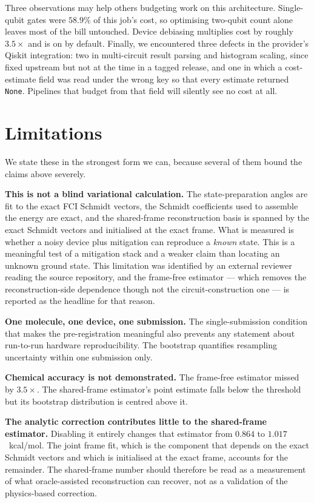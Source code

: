 \documentclass[aps,prx,twocolumn,superscriptaddress,nofootinbib,floatfix]{revtex4-2}
\begin{document}
Three observations may help others budgeting work on this architecture.
Single-qubit gates were $58.9\%$ of this job's cost, so optimising
two-qubit count alone leaves most of the bill untouched. Device debiasing
multiplies cost by roughly $3.5\times$ and is on by default. Finally, we
encountered three defects in the provider's Qiskit integration: two in
multi-circuit result parsing and histogram scaling, since fixed upstream
but not at the time in a tagged release, and one in which a cost-estimate
field was read under the wrong key so that every estimate returned
\texttt{None}. Pipelines that budget from that field will silently see no
cost at all.

\section{Limitations}
\label{sec:limits}

We state these in the strongest form we can, because several of them bound
the claims above severely.

\textbf{This is not a blind variational calculation.} The
state-preparation angles are fit to the exact FCI Schmidt vectors, the
Schmidt coefficients used to assemble the energy are exact, and the
shared-frame reconstruction basis is spanned by the exact Schmidt
vectors and initialised at the exact frame. What is measured is whether a
noisy device plus mitigation can reproduce a \emph{known} state. This is a
meaningful test of a mitigation stack and a weaker claim than locating an
unknown ground state. This limitation was identified by an external
reviewer reading the source repository, and the frame-free estimator ---
which removes the reconstruction-side dependence though not the
circuit-construction one --- is reported as the headline for that reason.

\textbf{One molecule, one device, one submission.} The single-submission
condition that makes the pre-registration meaningful also prevents any
statement about run-to-run hardware reproducibility. The bootstrap
quantifies resampling uncertainty within one submission only.

\textbf{Chemical accuracy is not demonstrated.} The frame-free estimator
missed by $3.5\times$. The shared-frame estimator's point estimate falls
below the threshold but its bootstrap distribution is centred above it.

\textbf{The analytic correction contributes little to the shared-frame
estimator.} Disabling it entirely changes that estimator from $0.864$ to
$1.017$~kcal/mol. The joint frame fit, which is the component that depends
on the exact Schmidt vectors and which is initialised at the exact frame,
accounts for the remainder. The shared-frame number should therefore be
read as a measurement of what oracle-assisted reconstruction can recover,
not as a validation of the physics-based correction.
\end{document}

